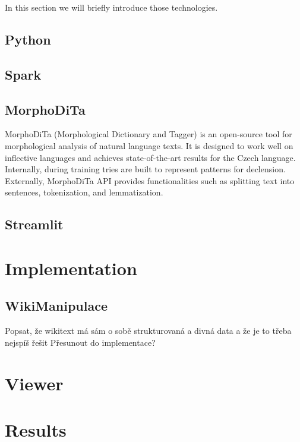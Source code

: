 In this section we will briefly introduce those technologies.
\subsection{Python}
\subsection{Spark}

\subsection{MorphoDiTa}
MorphoDiTa \cite{Morphodita} (Morphological Dictionary and Tagger) is an open-source tool for morphological analysis of natural language texts. It is designed to work well on inflective languages and achieves state-of-the-art results for the Czech language. Internally, during training tries are built to represent patterns for declension. Externally, MorphoDiTa API provides functionalities such as splitting text into sentences, tokenization, and lemmatization.

\subsection{Streamlit}


\section{Implementation}


\subsection{WikiManipulace}
Popsat, že wikitext má sám o sobě strukturovaná a divná data a že je to třeba nejspíš řešit Přesunout do implementace?

\section{Viewer}
\section{Results}

